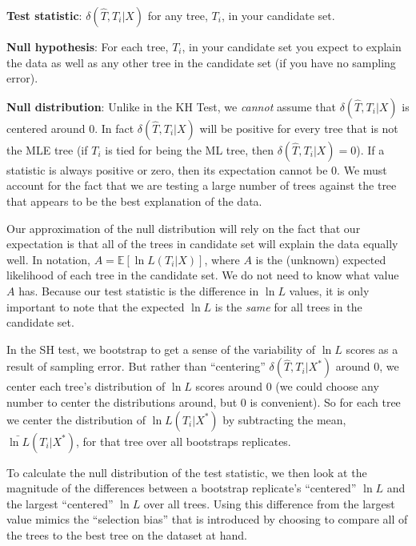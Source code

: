 \documentclass[11pt]{article}
\renewcommand{\subsubsection}[1]{%
\noindent\textbf{#1}:}
\newcommand{\lnL}{\ln L}
\newcommand{\expectation}{{\mathbb{E}}}
\newcommand{\expect}[1]{\expectation\left[#1\right]}
\begin{document}
\subsubsection{Test statistic} $\delta(\hat{T},T_i|X)$ for any tree, $T_i$, in your candidate set.

\subsubsection{Null hypothesis} For each tree, $T_i$, in your candidate set you expect to explain the data as well as any other tree in the candidate set (if you have no sampling error).

\subsubsection{Null distribution} Unlike in the KH Test, we {\em cannot} assume that $\delta(\hat{T},T_i|X)$ is centered around 0.
In fact $\delta(\hat{T},T_i|X)$ will be positive for every tree that is not the MLE tree (if $T_i$ is tied for being the ML tree, then  $\delta(\hat{T},T_i|X) = 0$).
If a statistic is always positive or zero, then its expectation cannot be 0.
We must account for the fact that we are testing a large number of trees against the tree that appears to be the best explanation of  the data.

Our approximation of the null distribution will rely on the fact that our expectation is that all of the trees in candidate set will explain the data equally well.
In notation, $A = \expect{\lnL(T_i|X)}$, where $A$ is the (unknown) expected likelihood of each tree in the candidate set.
We do not need to know what value $A$ has.
Because our test statistic is the difference in $\lnL$ values, it is only important to note that the expected $\lnL$ is the {\em same} for all trees in the candidate set.

In the SH test, we bootstrap to get a sense of the variability of $\lnL$ scores as a result of sampling error.
But rather than ``centering'' $\delta\left(\hat T,T_i|X^{\ast}\right)$ around 0,  we center each tree's distribution of $\lnL$ scores around 0 (we could choose any number to center the distributions around, but 0 is convenient).
So for each tree we center the distribution of $\lnL\left(T_i|X^{\ast}\right)$ by subtracting the mean, $\bar{\lnL}\left(T_i|X^{\ast}\right)$, for that tree over all bootstraps replicates.

To calculate the null distribution of the test statistic, we then look at the magnitude of the differences between a bootstrap replicate's ``centered'' $\lnL$ and the largest ``centered'' $\lnL$ over all trees.
Using this difference from the largest value mimics the ``selection bias'' that is introduced by choosing to compare all of the trees to the best tree on the dataset at hand.
\end{document}
